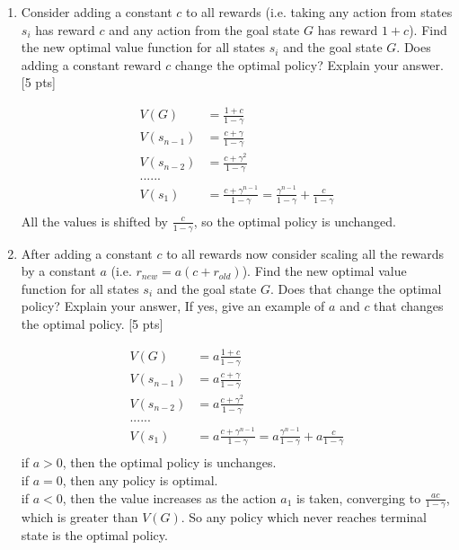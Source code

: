 \documentclass[11pt]{article}
\begin{document}
\begin{enumerate}[label=(\alph*)]
\item Consider adding a constant $c$ to all rewards (i.e. taking any action from states $s_i$ has reward $c$ and any action from the goal state $G$ has reward $1+c$). Find the new optimal value function for all states $s_i$ and the goal state $G$. Does adding a constant reward $c$ change the optimal policy? Explain your answer. [5 pts]

\begin{tcolorbox}[breakable]
  \begin{equation}
    \begin{aligned}
      V(G)&=\frac{1+c}{1-\gamma}\\
      V(s_{n-1})&=\frac{c+\gamma}{1-\gamma}\\
      V(s_{n-2})&=\frac{c+\gamma^2}{1-\gamma}\\
      ......\\
      V(s_1)&=\frac{c+\gamma^{n-1}}{1-\gamma}=\frac{\gamma^{n-1}}{1-\gamma}+\frac{c}{1-\gamma}\\
    \end{aligned}
  \end{equation}
  All the values is shifted by $\frac{c}{1-\gamma}$, so the optimal policy is unchanged.
\end{tcolorbox}

\item After adding a constant $c$ to all rewards now consider scaling all the rewards by a constant $a$ (i.e. $r_{new} = a(c+ r_{old})$). Find the new optimal value function for all states $s_i$ and the goal state $G$. Does that change the optimal policy? Explain your answer, If yes, give an example of $a$ and $c$ that changes the optimal policy. [5 pts]

\begin{tcolorbox}[breakable]
  \begin{equation}
    \begin{aligned}
      V(G)&=a\frac{1+c}{1-\gamma}\\
      V(s_{n-1})&=a\frac{c+\gamma}{1-\gamma}\\
      V(s_{n-2})&=a\frac{c+\gamma^2}{1-\gamma}\\
      ......\\
      V(s_1)&=a\frac{c+\gamma^{n-1}}{1-\gamma}=a\frac{\gamma^{n-1}}{1-\gamma}+a\frac{c}{1-\gamma}\\
    \end{aligned}
  \end{equation}
  if $a>0$, then the optimal policy is unchanges.\\
  if $a=0$, then any policy is optimal.\\
  if $a<0$, then the value increases as the action $a_1$ is taken, converging to $\frac{ac}{1-\gamma}$, which is greater than $V(G)$. So any policy which never reaches terminal state is the optimal policy.
\end{tcolorbox}

\end{enumerate}
\end{document}
